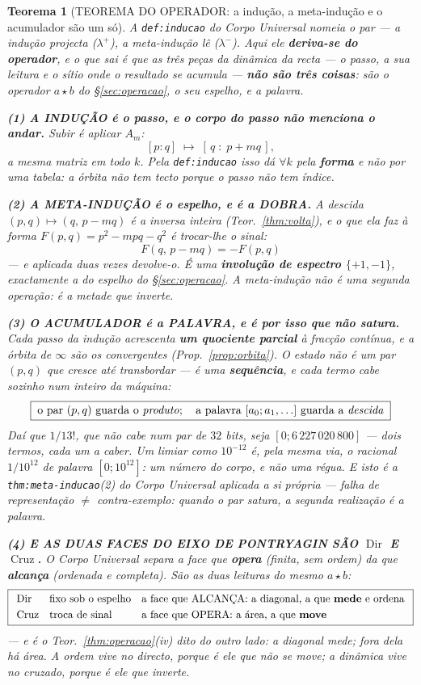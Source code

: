 \documentclass[11pt,a4paper]{article}
\newtheorem{teorema}{Teorema}
\newcommand{\code}[1]{\texttt{\small #1}}
\begin{document}
\begin{teorema}[TEOREMA DO OPERADOR: a indução, a meta-indução e o acumulador são um
só]\label{thm:operador}
A \code{def:inducao} do \emph{Corpo Universal} nomeia o par --- a indução projecta
($\lambda^{+}$), a meta-indução lê ($\lambda^{-}$). Aqui ele \textbf{deriva-se do
operador}, e o que sai é que as três peças da dinâmica da recta --- o passo, a sua leitura
e o sítio onde o resultado se acumula --- \textbf{não são três coisas}: são o operador
$a\star b$ do \S\ref{sec:operacao}, o seu espelho, e a palavra.

\textbf{(1) A INDUÇÃO é o passo, e o corpo do passo não menciona o andar.} Subir é aplicar
$A_m$:
\[
[p:q]\;\longmapsto\;[\,q\;:\;p+mq\,],
\]
a mesma matriz em todo $k$. Pela \code{def:inducao} isso dá $\forall k$ pela
\textbf{forma} e não por uma tabela: \emph{a órbita não tem tecto porque o passo não tem
índice}.

\textbf{(2) A META-INDUÇÃO é o espelho, e é a DOBRA.} A descida $(p,q)\mapsto(q,\,p-mq)$ é
a inversa inteira (Teor.~\ref{thm:volta}), e o que ela faz à forma
$F(p,q)=p^{2}-mpq-q^{2}$ é \emph{trocar-lhe o sinal}:
\[
\boxed{\;F(q,\,p-mq)=-F(p,q)\;}
\]
--- e aplicada duas vezes devolve-o. É uma \textbf{involução de espectro $\{+1,-1\}$},
exactamente a do espelho do \S\ref{sec:operacao}. \emph{A meta-indução não é uma segunda
operação: é a metade que inverte.}

\textbf{(3) O ACUMULADOR é a PALAVRA, e é por isso que não satura.} Cada passo da indução
acrescenta \textbf{um quociente parcial} à fracção contínua, e a órbita de $\infty$ são os
convergentes (Prop.~\ref{prop:orbita}). O estado não é um par $(p,q)$ que cresce até
transbordar --- é uma \textbf{sequência}, e cada termo cabe sozinho num inteiro da máquina:
\[
\boxed{\;\text{o par }(p,q)\text{ guarda o \emph{produto}};\quad
        \text{a palavra }[a_0;a_1,\ldots]\text{ guarda a \emph{descida}}\;}
\]
Daí que $1/13!$, que não cabe num par de $32$ bits, seja $[0;6\,227\,020\,800]$ --- dois
termos, cada um a caber. \emph{Um limiar como $10^{-12}$ é, pela mesma via, o racional
$1/10^{12}$ de palavra $[0;10^{12}]$: um número do corpo, e não uma régua.} E isto é a
\code{thm:meta-inducao}(2) do \emph{Corpo Universal} aplicada a si própria --- \emph{falha de representação
$\neq$ contra-exemplo}: quando o par satura, a segunda realização é a palavra.

\textbf{(4) E AS DUAS FACES DO EIXO DE PONTRYAGIN SÃO $\operatorname{Dir}$ E
$\operatorname{Cruz}$.} O \emph{Corpo Universal} separa a face que \textbf{opera} (finita,
sem ordem) da que \textbf{alcança} (ordenada e completa). São as duas leituras do mesmo
$a\star b$:
\[
\boxed{
\begin{array}{lll}
\operatorname{Dir} & \text{fixo sob o espelho} & \text{a face que ALCANÇA: a diagonal, a
que \textbf{mede} e ordena}\\[3pt]
\operatorname{Cruz} & \text{troca de sinal} & \text{a face que OPERA: a área, a que
\textbf{move}}
\end{array}}
\]
--- e é o Teor.~\ref{thm:operacao}(iv) dito do outro lado: \emph{a diagonal mede; fora dela
há área}. A ordem vive no directo, porque é ele que não se move; a dinâmica vive no
cruzado, porque é ele que inverte.


\end{teorema}
\end{document}
